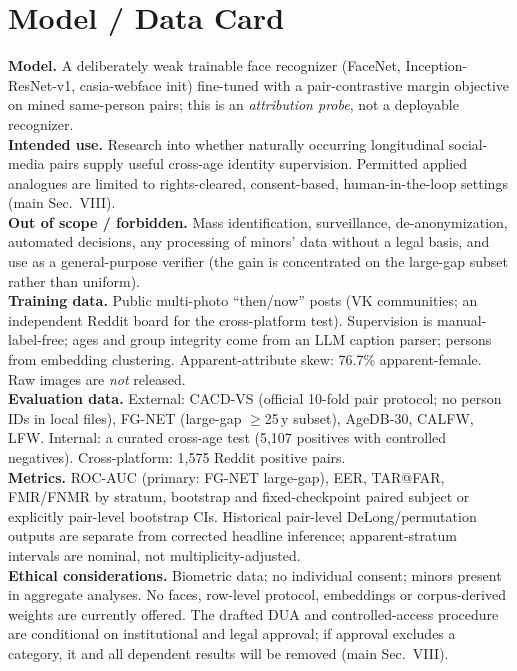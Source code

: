 \documentclass[journal]{IEEEtran}
\newcommand{\mainsec}[1]{main Sec.~#1}
\begin{document}
\section{Model / Data Card}\label{sec:card}
\noindent\textbf{Model.} A deliberately weak trainable face recognizer (FaceNet, Inception-ResNet-v1,
casia-webface init) fine-tuned with a pair-contrastive margin objective on mined same-person pairs;
this is an \emph{attribution probe}, not a deployable recognizer.\\
\textbf{Intended use.} Research into whether naturally occurring longitudinal social-media pairs supply
useful cross-age identity supervision. Permitted applied analogues are limited to rights-cleared,
consent-based, human-in-the-loop settings (\mainsec{VIII}).\\
\textbf{Out of scope / forbidden.} Mass identification, surveillance, de-anonymization, automated
decisions, any processing of minors' data without a legal basis, and use as a general-purpose verifier
(the gain is concentrated on the large-gap subset rather than uniform).\\
\textbf{Training data.} Public multi-photo ``then/now'' posts (VK communities; an independent Reddit
board for the cross-platform test). Supervision is manual-label-free; ages and group integrity come
from an LLM caption parser; persons from embedding clustering. Apparent-attribute skew: 76.7\%
apparent-female. Raw images are \emph{not} released.\\
\textbf{Evaluation data.} External: CACD-VS (official 10-fold pair protocol; no person IDs in local files), FG-NET (large-gap $\geq$25\,y subset), AgeDB-30, CALFW, LFW. Internal:
a curated cross-age test (5{,}107 positives with controlled negatives). Cross-platform: 1{,}575 Reddit
positive pairs.\\
\textbf{Metrics.} ROC-AUC (primary: FG-NET large-gap), EER, TAR@FAR, FMR/FNMR by stratum, bootstrap and
fixed-checkpoint paired subject or explicitly pair-level bootstrap CIs. Historical
pair-level DeLong/permutation outputs are separate from corrected headline inference;
apparent-stratum intervals are nominal, not multiplicity-adjusted.\\
\textbf{Ethical considerations.} Biometric data; no individual consent; minors present in aggregate
analyses. No faces, row-level protocol, embeddings or corpus-derived weights are currently offered.
The drafted DUA and controlled-access procedure are conditional on institutional and legal approval;
if approval excludes a category, it and all dependent results will be removed (\mainsec{VIII}).\\
\end{document}
